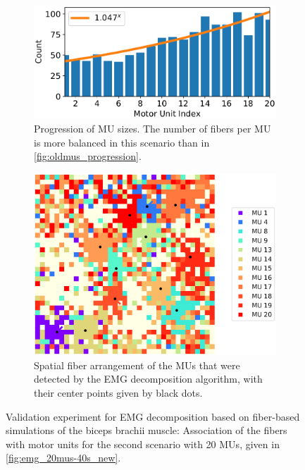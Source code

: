 \begin{figure}
  \centering%
  \begin{subfigure}[t]{0.45\textwidth}%
    \centering%
    \includegraphics[width=\textwidth]{images/results/application/newmus1.pdf}%
    \caption{Progression of MU sizes. The number of fibers per MU is more balanced in this scenario than in \cref{fig:oldmus_progression}.}%
    \label{fig:newmus_progression}%
  \end{subfigure}\hfill
  \begin{subfigure}[t]{0.45\textwidth}%
    \centering%
    \includegraphics[width=\textwidth]{images/results/application/newmus3.pdf}%
    \caption{Spatial fiber arrangement of the MUs that were detected by the EMG decomposition algorithm, with their center points given by black dots.}%
    \label{fig:newmus_2d}%
  \end{subfigure} 
  \caption{Validation experiment for EMG decomposition based on fiber-based simulations of the biceps brachii muscle: Association of the fibers with motor units for the second scenario with 20 MUs, given in \cref{fig:emg_20mus-40s_new}.}%
  \label{fig:newmus}%
\end{figure}

